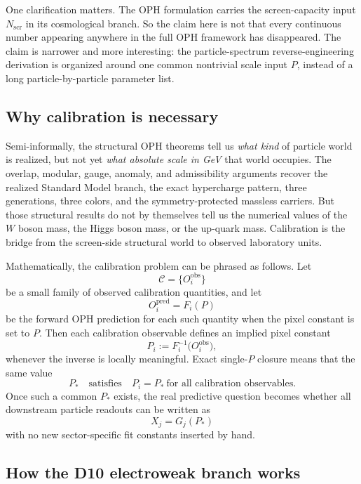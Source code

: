 \documentclass[11pt]{article}
\begin{document}
One clarification matters. The OPH formulation carries the
screen-capacity input \(N_{\mathrm{scr}}\) in its cosmological branch. So the claim here is
not that every continuous number appearing anywhere in the full OPH framework has disappeared. The
claim is narrower and more interesting: the particle-spectrum reverse-engineering derivation is
organized around one common nontrivial scale input \(P\), instead of a long particle-by-particle
parameter list.

\subsection{Why calibration is necessary}

Semi-informally, the structural OPH theorems tell us \emph{what kind} of particle world is
realized, but not yet \emph{what absolute scale in GeV} that world occupies. The overlap,
modular, gauge, anomaly, and admissibility arguments recover the realized Standard Model branch,
the exact hypercharge pattern, three generations, three colors, and the symmetry-protected
massless carriers. But those structural results do not by themselves tell us the numerical values
of the \(W\) boson mass, the Higgs boson mass, or the up-quark mass. Calibration is the bridge
from the screen-side structural world to observed laboratory units.

Mathematically, the calibration problem can be phrased as follows. Let
\[
\mathcal C=\{O_i^{\mathrm{obs}}\}
\]
be a small family of observed calibration quantities, and let
\[
O_i^{\mathrm{pred}} = F_i(P)
\]
be the forward OPH prediction for each such quantity when the pixel constant is set to \(P\).
Then each calibration observable defines an implied pixel constant
\[
P_i := F_i^{-1}\!\bigl(O_i^{\mathrm{obs}}\bigr),
\]
whenever the inverse is locally meaningful. Exact single-\(P\) closure means that the same value
\[
P_* \quad \text{satisfies} \quad P_i=P_* \ \text{for all calibration observables}.
\]
Once such a common \(P_*\) exists, the real predictive question becomes whether all downstream
particle readouts can be written as
\[
X_j = G_j(P_*)
\]
with no new sector-specific fit constants inserted by hand.

\subsection{How the D10 electroweak branch works}
\end{document}
